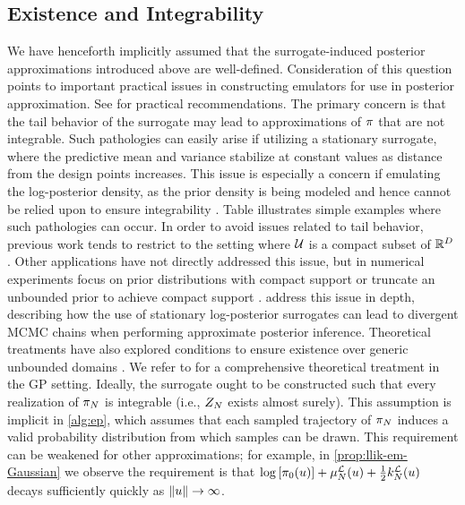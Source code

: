 \documentclass[12pt]{article}
\begin{document}
\subsection{Existence and Integrability} \label{sec:existence}
We have henceforth implicitly assumed that the surrogate-induced posterior approximations 
introduced above are well-defined. Consideration of this question points to important 
practical issues in constructing emulators for use in posterior approximation. See
 for practical recommendations. The primary concern
is that the tail behavior of the surrogate may lead to approximations of $\postDens$ that 
are not integrable. Such pathologies can easily arise if utilizing a stationary surrogate, where 
the predictive mean and variance stabilize at constant values as distance from the design points 
increases. This issue is especially a concern if emulating the log-posterior density, as the prior 
density is being modeled and hence cannot be relied upon to ensure integrability \citep{emPostDens}.
Table \todo illustrates simple examples where such pathologies can occur.
In order to avoid issues related to
tail behavior, previous work tends to restrict to the setting where $\parSpace$
is a compact subset of $\R^{\dimPar}$ \citep{StuartTeck1, VehtariParallelGP}.
Other applications have not directly addressed this issue, but in numerical experiments focus on 
prior distributions with compact support \citet{trainDynamics,FATES_CES} or truncate an unbounded
prior to achieve compact support \citep{gp_surrogates_random_exploration,FerEmulation}. 
\citet{emPostDens} address this issue in depth, describing how the use of stationary log-posterior
surrogates can lead to divergent MCMC chains when performing approximate posterior inference.
Theoretical treatments have also explored conditions to ensure existence over generic unbounded
domains \citep{random_fwd_models,garegnani2021NoisyMCMC}. We refer to 
\citep{StuartTeck1,StuartTeck2} for a comprehensive theoretical treatment in the GP setting.
Ideally, the surrogate ought to be constructed such that every realization of $\postEm[\Ndesign]$
is integrable (i.e., $\normCstEm$ exists almost surely). This assumption is implicit in \cref{alg:ep}, 
which assumes that each sampled trajectory of $\postEm[\Ndesign]$ induces a valid probability 
distribution from which samples can be drawn. This requirement can be weakened for other 
approximations; for example, in \cref{prop:llik-em-Gaussian} we observe the requirement is that
$\log\left[\priorDens(\Par)\right] + \emMean[\Ndesign]{\llik}(\Par) + \frac{1}{2}\emKer[\Ndesign]{\llik}(\Par)$
decays sufficiently quickly as $\norm{\Par} \to \infty$. 
\end{document}
